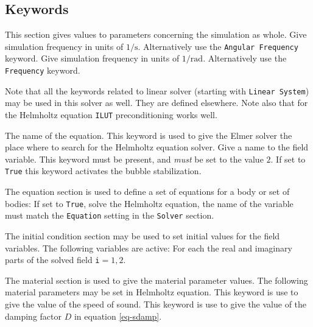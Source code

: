 \begin{versiona}
\section{Keywords} 
\end{versiona}

\sifbegin

This section gives values to parameters concerning the simulation
as whole.
\sifbegin
{}
Give simulation frequency in units of $1/\mathrm{s}$.
Alternatively use the {\tt Angular Frequency} keyword.
Give simulation frequency in units of $1/\mathrm{rad}$.
Alternatively use the {\tt Frequency} keyword.
\sifend

Note that all the keywords related to linear solver (starting
with {\tt Linear System})
may be used in this solver as well.  They are defined elsewhere. 
Note also that for the Helmholtz equation {\tt ILUT} preconditioning
works well.

\sifbegin
{} 
The name of the equation.
This keyword is used to give the Elmer solver the place where
to search for the Helmholtz equation solver.
Give a name to the field variable.
This keyword must be present, and {\it must} be set to the value $2$.
If set to {\tt True} this keyword activates the bubble stabilization.
\sifend

The equation section is used to define a set of equations for a body or set of bodies:
\sifbegin
{} If set to {\tt True}, solve the Helmholtz equation,
the name of the variable must match the {\tt Equation} setting in the {\tt Solver} section.
\sifend


The initial condition section may be used to set initial values for the field
variables. The following variables are active:
\sifbegin
{} 
For each the real and imaginary parts of the solved field {\tt i}$=1,2$.
\sifend

The material section is used to give the material parameter values. The
following material parameters may be set in Helmholtz equation.
\sifbegin
{} 
This keyword is use to give the value of the speed of sound.
This keyword is use to give the value of the damping factor $D$ in
equation \ref{eq-sdamp}.
\sifend


